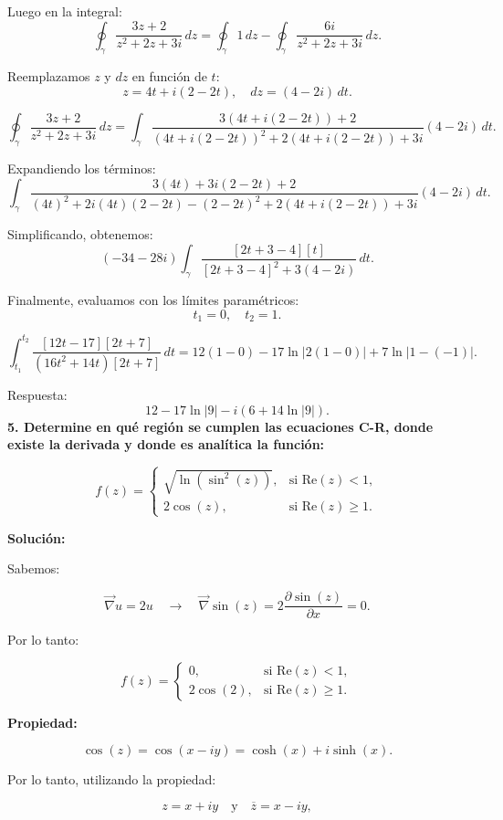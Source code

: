 \documentclass[a4paper,12pt]{article}
\begin{document}
Luego en la integral:
\[
\oint_\gamma \frac{3z + 2}{z^2 + 2z + 3i} \, dz = \oint_\gamma 1 \, dz - \oint_\gamma \frac{6i}{z^2 + 2z + 3i} \, dz.
\]

Reemplazamos $z$ y $dz$ en función de $t$:
\[
z = 4t + i(2 - 2t), \quad dz = (4 - 2i) \, dt.
\]

\[
\oint_\gamma \frac{3z + 2}{z^2 + 2z + 3i} \, dz = \int_\gamma \frac{3(4t + i(2 - 2t)) + 2}{(4t + i(2 - 2t))^2 + 2(4t + i(2 - 2t)) + 3i} (4 - 2i) \, dt.
\]

Expandiendo los términos:
\[
\int_\gamma \frac{3(4t) + 3i(2 - 2t) + 2}{(4t)^2 + 2i(4t)(2 - 2t) - (2 - 2t)^2 + 2(4t + i(2 - 2t)) + 3i} (4 - 2i) \, dt.
\]

Simplificando, obtenemos:
\[
(-34 - 28i) \int_\gamma \frac{[2t + 3 - 4][t]}{[2t + 3 - 4]^2 + 3(4 - 2i)} \, dt.
\]

Finalmente, evaluamos con los límites paramétricos:
\[
t_1 = 0, \quad t_2 = 1.
\]

\[
\int_{t_1}^{t_2} \frac{[12t - 17][2t + 7]}{(16t^2 + 14t)[2t + 7]} \, dt = 12(1 - 0) - 17\ln|2(1 - 0)| + 7\ln|1 - (-1)|.
\]

Respuesta:
\[
12 - 17\ln|9| - i(6 + 14\ln|9|).
\]
\textbf{5. Determine en qué región se cumplen las ecuaciones C-R, donde existe la derivada y donde es analítica la función:}

\[
f(z) =
\begin{cases}
\sqrt{\ln(\sin^2(z))}, & \text{si } \text{Re}(z) < 1, \\
2\cos(z), & \text{si } \text{Re}(z) \geq 1.
\end{cases}
\]

\textbf{Solución:}

Sabemos:

\[
\vec{\nabla} u = 2u \quad \to \quad \vec{\nabla} \sin(z) = 2 \frac{\partial \sin(z)}{\partial x} = 0.
\]

Por lo tanto:

\[
f(z) =
\begin{cases}
0, & \text{si } \text{Re}(z) < 1, \\
2\cos(2), & \text{si } \text{Re}(z) \geq 1.
\end{cases}
\]

\textbf{Propiedad:}

\[
\cos(z) = \cos(x - iy) = \cosh(x) + i\sinh(x).
\]

Por lo tanto, utilizando la propiedad:

\[
z = x + iy \quad \text{y} \quad \overline{z} = x - iy,
\]
\end{document}
